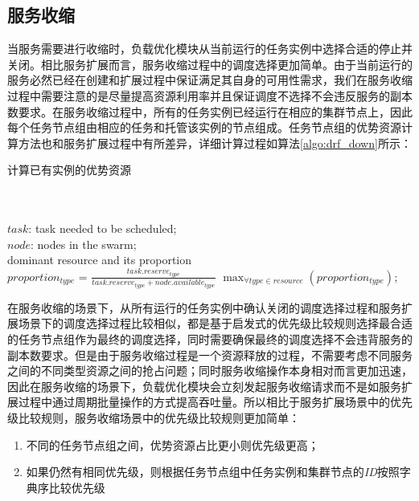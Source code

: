 \subsection{服务收缩}\label{sec:scalein}
当服务需要进行收缩时，负载优化模块从当前运行的任务实例中选择合适的停止并关闭。相比服务扩展而言，服务收缩过程中的调度选择更加简单。由于当前运行的服务必然已经在创建和扩展过程中保证满足其自身的可用性需求，我们在服务收缩过程中需要注意的是尽量提高资源利用率并且保证调度不选择不会违反服务的副本数要求。在服务收缩过程中，所有的任务实例已经运行在相应的集群节点上，因此每个任务节点组由相应的任务和托管该实例的节点组成。任务节点组的优势资源计算方法也和服务扩展过程中有所差异，详细计算过程如算法\ref{algo:drf_down}所示：
\begin{algorithm}[H]
\caption{计算已有实例的优势资源}
\label{algo:drf_down}
\begin{algorithmic}[0]
\\
\Require ~~\
\\
$task$: task needed to be scheduled;\\
$node$: nodes in the swarm;
\Ensure ~~\
\\
dominant resource and its proportion\\

        \State $proportion_{type}$ = $\frac{task.reserve_{type}}{task.reserve_{type}+node.available_{type}}$
    \EndFor
    \State \Return $\max_{\forall type \in resource} {(proportion_{type})}$;
\EndFunction
\end{algorithmic}
\end{algorithm}
在服务收缩的场景下，从所有运行的任务实例中确认关闭的调度选择过程和服务扩展场景下的调度选择过程比较相似，都是基于启发式的优先级比较规则选择最合适的任务节点组作为最终的调度选择，同时需要确保最终的调度选择不会违背服务的副本数要求。但是由于服务收缩过程是一个资源释放的过程，不需要考虑不同服务之间的不同类型资源之间的抢占问题；同时服务收缩操作本身相对而言更加迅速，因此在服务收缩的场景下，负载优化模块会立刻发起服务收缩请求而不是如服务扩展过程中通过周期批量操作的方式提高吞吐量。所以相比于服务扩展场景中的优先级比较规则，服务收缩场景中的优先级比较规则更加简单：
\begin{enumerate}
\item 不同的任务节点组之间，优势资源占比更小则优先级更高；
\item 如果仍然有相同优先级，则根据任务节点组中任务实例和集群节点的\emph{ID}按照字典序比较优先级
\end{enumerate}

